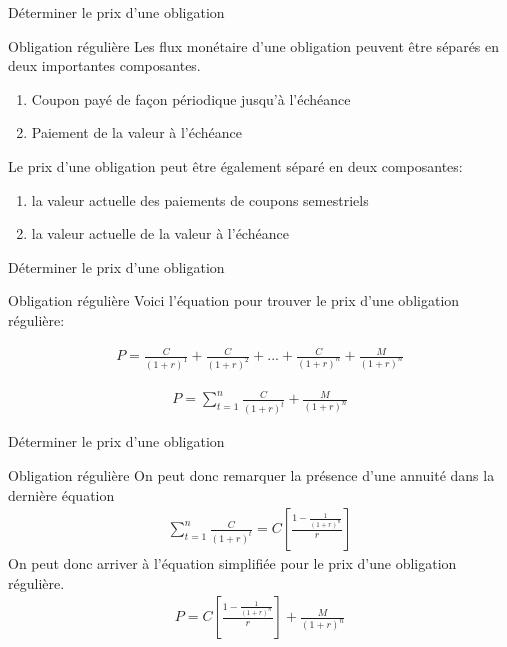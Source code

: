 \documentclass{beamer}
\begin{document}
\begin{frame}{Déterminer le prix d'une obligation}
\begin{block}{Obligation régulière}
Les flux monétaire d'une obligation peuvent être séparés en deux importantes composantes. 

\begin{enumerate}
\item Coupon payé de façon périodique jusqu'à l'échéance
\item Paiement de la valeur à l'échéance
\end{enumerate}
\vspace{1cm}
Le prix d'une obligation peut être également séparé en deux composantes:

\begin{enumerate}
\item la valeur actuelle des paiements de coupons semestriels
\item la valeur actuelle de la valeur à l'échéance 
\end{enumerate}
\end{block}
\end{frame}


\begin{frame}{Déterminer le prix d'une obligation}
\begin{block}{Obligation régulière}
Voici l'équation pour trouver le prix d'une obligation régulière:

\begin{align*}
P=\frac{C}{(1+r)^1}+\frac{C}{(1+r)^2}+...+\frac{C}{(1+r)^n}+\frac{M}{(1+r)^n}
\end{align*}

\begin{align*}
P=\sum_{t=1}^{n} \frac{C}{(1+r)^t}+\frac{M}{(1+r)^n}
\end{align*}

\end{block}
\end{frame}



\begin{frame}{Déterminer le prix d'une obligation}
\begin{block}{Obligation régulière}
On peut donc remarquer la présence d'une annuité dans la dernière équation 
\begin{align*}
\sum_{t=1}^{n} \frac{C}{(1+r)^t}=C \left[ \frac{1-\frac{1}{(1+r)^n}}{r} \right]
\end{align*}
On peut donc arriver à l'équation simplifiée pour le prix d'une obligation régulière.
\begin{align*}
P=C \left[ \frac{1-\frac{1}{(1+r)^n}}{r} \right]+\frac{M}{(1+r)^n}
\end{align*}

\end{block}
\end{frame}
\end{document}
